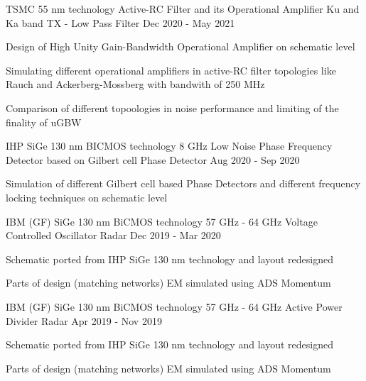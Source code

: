 \begin{cventries}

\cventry
{TSMC 55 nm technology} %
{Active-RC Filter and its Operational Amplifier} %
{Ku and Ka band TX - Low Pass Filter} %
{Dec 2020 - May 2021} %
{ %
\begin{cvitems}
    \item {Design of High Unity Gain-Bandwidth Operational Amplifier on schematic level}
    \item {Simulating different operational amplifiers in active-RC filter topologies like Rauch and Ackerberg-Mossberg with bandwith of 250 MHz}
    \item {Comparison of different topoologies in noise performance and limiting of the finality of uGBW}
\end{cvitems} 
}


\cventry
{IHP SiGe 130 nm BICMOS technology} %
{8 GHz Low Noise Phase Frequency Detector based on Gilbert cell} %
{Phase Detector} %
{Aug 2020 - Sep 2020} %
{ %
\begin{cvitems}
    \item {Simulation of different Gilbert cell based Phase Detectors and different frequency locking techniques on schematic level}
\end{cvitems} 
}


\cventry
{IBM (GF) SiGe 130 nm BiCMOS technology} %
{57 GHz - 64 GHz Voltage Controlled Oscillator} %
{Radar} %
{Dec 2019 - Mar 2020} %
{ %
\begin{cvitems}
    \item {Schematic ported from IHP SiGe 130 nm technology and layout redesigned}
    \item {Parts of design (matching networks) EM simulated using ADS Momentum}
\end{cvitems} 
}


\cventry
{IBM (GF) SiGe 130 nm BiCMOS technology} %
{57 GHz - 64 GHz Active Power Divider} %
{Radar} %
{Apr 2019 - Nov 2019} %
{ %
\begin{cvitems}
    \item {Schematic ported from IHP SiGe 130 nm technology and layout redesigned}
    \item {Parts of design (matching networks) EM simulated using ADS Momentum}
\end{cvitems} 
}


\end{cventries}
